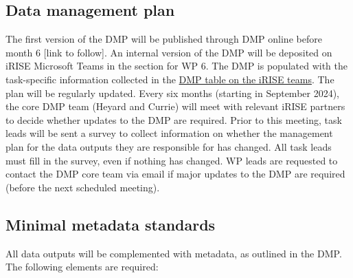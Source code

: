 \documentclass[
]{article}
\begin{document}
\hypertarget{data-management-plan}{%
\subsection{Data management plan}\label{data-management-plan}}

The first version of the DMP will be published through DMP online before month 6 {[}link to follow{]}. An internal version of the DMP will be deposited on iRISE Microsoft Teams in the section for WP 6. The DMP is populated with the task-specific information collected in the \href{https://charitede.sharepoint.com/:x:/r/sites/iRISE/_layouts/15/Doc.aspx?action=edit\&sourcedoc=\%7B8fc7f6ef-0e91-450d-b04b-792fd74e205f\%7D\&wdOrigin=TEAMS-WEB.teamsSdk.openFilePreview\&wdExp=TEAMS-CONTROL\&web=1}{DMP table on the iRISE teams}. The plan will be regularly updated. Every six months (starting in September 2024), the core DMP team (Heyard and Currie) will meet with relevant iRISE partners to decide whether updates to the DMP are required. Prior to this meeting, task leads will be sent a survey to collect information on whether the management plan for the data outputs they are responsible for has changed. All task leads must fill in the survey, even if nothing has changed. WP leads are requested to contact the DMP core team via email if major updates to the DMP are required (before the next scheduled meeting).

\hypertarget{minimal-metadata-standards}{%
\subsection{Minimal metadata standards}\label{minimal-metadata-standards}}

All data outputs will be complemented with metadata, as outlined in the DMP. The following elements are required:
\end{document}
